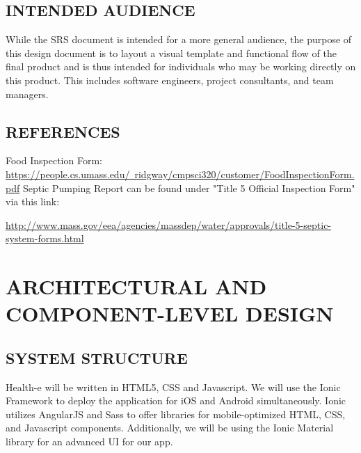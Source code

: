 \documentclass[twoside,letterpaper]{article}
\begin{document}
\subsection[INTENDED AUDIENCE]{\rmfamily\bfseries\color{black}
INTENDED AUDIENCE}
{\rmfamily\color{black}
While the SRS document is intended for a more general audience, the purpose of this design document is to layout a visual template and functional flow of the final product and is thus intended for individuals who may be working directly on this product. This includes software engineers, project consultants, and team managers. 
}

\subsection[REFERENCES]{\rmfamily\bfseries\color{black}
REFERENCES}
{\rmfamily\color{black}
Food Inspection Form: 
\hyperref[]{https://people.cs.umass.edu/~ridgway/cmpsci320/customer/FoodInspectionForm.pdf}
\newline
Septic Pumping Report can be found under "Title 5 Official Inspection Form" via this link: 
\newline

\hyperref[]{http://www.mass.gov/eea/agencies/massdep/water/approvals/title-5-septic-system-forms.html}
}

\clearpage\section[ARCHITECTURAL AND COMPONENT-LEVEL DESIGN]{\rmfamily\bfseries\color{black}
ARCHITECTURAL AND COMPONENT-LEVEL DESIGN}
\subsection[SYSTEM STRUCTURE]{\rmfamily\bfseries\color{black}
SYSTEM STRUCTURE}
Health-e will be written in HTML5, CSS and Javascript. We will use the Ionic Framework to deploy the application for iOS and Android simultaneously. Ionic utilizes AngularJS and Sass to offer libraries for mobile-optimized HTML, CSS, and Javascript components. Additionally, we will be using the Ionic Material library for an advanced UI for our app. 
\end{document}
